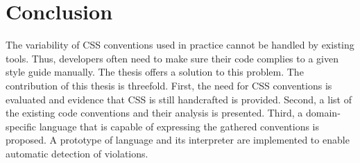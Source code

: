\documentclass[parskip=full]{uvamscse}
\begin{document}

\chapter{Conclusion}
\label{sec:conclusion}

The variability of CSS conventions used in practice cannot be handled by existing tools. Thus, developers often need to make sure their code complies to a given style guide manually. The thesis offers a solution to this problem. The contribution of this thesis is threefold. First, the need for CSS conventions is evaluated and
evidence that CSS is still handcrafted is provided. Second, a list of the existing code conventions
and their analysis is presented. Third, a domain-specific language that is capable of expressing the
gathered conventions is proposed. A prototype of language and its interpreter are implemented to
enable automatic detection of violations.

{%


}
\end{document}
